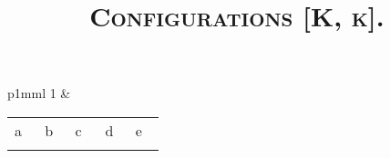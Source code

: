 \documentclass{article}
\title{\textsc{Configurations [K, k].}}
\begin{document}
\pagestyle{empty}
\maketitle
\thispagestyle{empty}
\vspace{-1cm}


\begin{tabular}{p{1mm}l}
1 &
\begin{tabular}{*{5}{p{0.15 \linewidth}}}
\hspace{1.5cm} a & \hspace{1.5cm} b & \hspace{1.5cm} c & \hspace{1.5cm} d & \hspace{1.5cm} e \\[-5mm]

\def\piezas{Ka3, kc3}
\setchessboard{setpieces=\piezas}
\chessboard[style=myset]
& 

\def\piezas{kb1,Kb3}
\setchessboard{setpieces=\piezas}
\chessboard[style=myset]
& 

\def\piezas{Ka3, kc1}
\setchessboard{setpieces=\piezas}
\chessboard[style=myset]
& 

\def\piezas{ka1,Kb3}
\setchessboard{setpieces=\piezas}
\chessboard[style=myset]
& 

\def\piezas{Ka3,kc2}
\setchessboard{setpieces=\piezas}
\chessboard[style=myset]
\\ 

\end{tabular}
\end{tabular}
\end{document}
